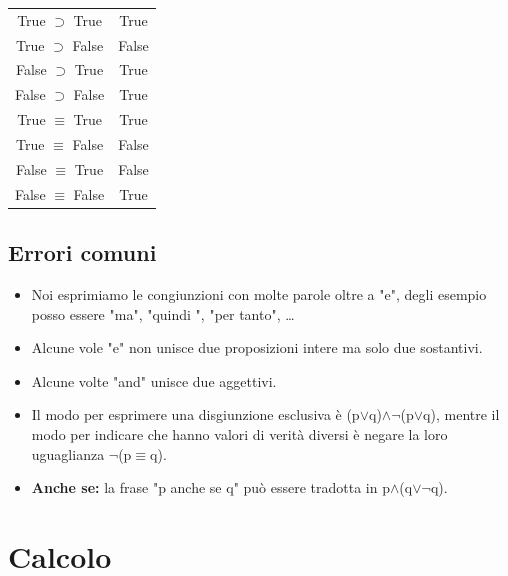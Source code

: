 \documentclass[../main.tex]{subfiles}
\begin{document}
    \begin{minipage}{0.5\textwidth}
        \begin{tabular}{|c|c|}
            \hline
            True $\supset$ True & True\\
            True $\supset$ False & False\\
            False $\supset$ True & True\\
            False $\supset$ False & True\\
            \hline
            True $\equiv$ True & True\\
            True $\equiv$ False & False\\
            False $\equiv$ True & False\\
            False $\equiv$ False & True\\
            \hline
        \end{tabular}
    \end{minipage}

    \section{Errori comuni}
    \begin{itemize}
        \item Noi esprimiamo le congiunzioni con molte parole oltre a "e", degli esempio posso essere "ma", "quindi ", "per tanto", \dots
        \item Alcune vole "e" non unisce due proposizioni intere ma solo due sostantivi.
        \item Alcune volte "and" unisce due aggettivi.
        \item Il modo per esprimere una disgiunzione esclusiva è (p$\lor$q)$\land \lnot$(p$\lor$q), mentre il modo per indicare che hanno valori di verità diversi è negare la loro uguaglianza $\lnot$(p$\equiv$q).
        \item \textbf{Anche se:} la frase "p anche se q" può essere tradotta in p$\land$(q$\lor \lnot$q).
    \end{itemize}

    \chapter{Calcolo}
\end{document}
